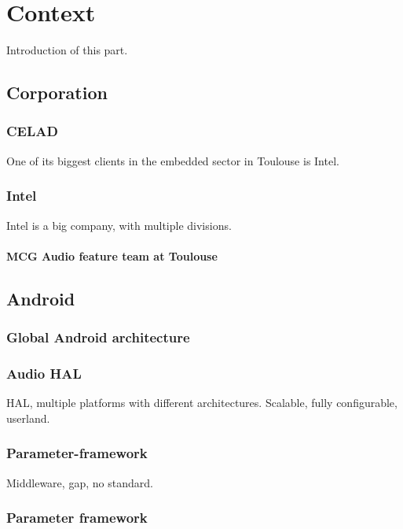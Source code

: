 \chapter{Context}

Introduction of this part.

\section{Corporation}

\subsection{CELAD}
One of its biggest clients in the embedded sector in Toulouse is Intel.

\subsection{Intel}
Intel is a big company, with multiple divisions.

\subsubsection{MCG Audio feature team at Toulouse}

\section{Android}

\subsection{Global Android architecture}

\subsection{Audio HAL}
HAL, multiple platforms with different architectures.
Scalable, fully configurable, userland.

\subsection{Parameter-framework}
Middleware, gap, no standard.

\subsection{Parameter framework}
